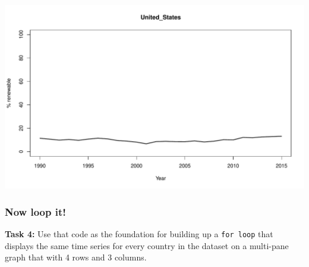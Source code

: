 \documentclass[
]{book}
\newenvironment{Shaded}{\begin{snugshade}}{\end{snugshade}}
\newcommand{\CommentTok}[1]{\textcolor[rgb]{0.56,0.35,0.01}{\textit{#1}}}
\newcommand{\DataTypeTok}[1]{\textcolor[rgb]{0.13,0.29,0.53}{#1}}
\newcommand{\DecValTok}[1]{\textcolor[rgb]{0.00,0.00,0.81}{#1}}
\newcommand{\KeywordTok}[1]{\textcolor[rgb]{0.13,0.29,0.53}{\textbf{#1}}}
\newcommand{\NormalTok}[1]{#1}
\newcommand{\StringTok}[1]{\textcolor[rgb]{0.31,0.60,0.02}{#1}}
\begin{document}
\begin{Shaded}
\end{Shaded}

\includegraphics{figures/unnamed-chunk-269-1.pdf}

\hypertarget{now-loop-it}{%
\subsubsection*{Now loop it!}\label{now-loop-it}}

\textbf{Task 4:} Use that code as the foundation for building up a \texttt{for\ loop} that displays the same time series for every country in the dataset on a multi-pane graph that with 4 rows and 3 columns.
\end{document}
